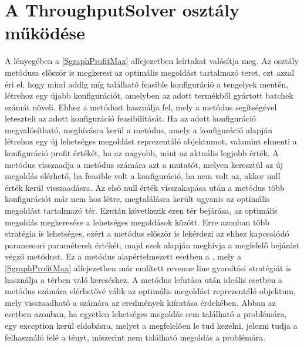 \section{A ThroughputSolver osztály működése} \label{throughput_solver}
A  lényegében a \ref{SgraphProfitMax} alfejezetben leírtakat valósítja meg.
Az osztály  metódusa először is megkeresi az optimális megoldást tartalmazó teret, ezt azzal éri el, hogy mind addig míg található feasible konfiguráció a tengelyek mentén, létrehoz egy újabb konfigurációt, amelyben az adott termékből gyártott batchek számát növeli.
Ehhez a  metódust használja fel, mely a  metódus segítségével leteszteli az adott konfiguráció feasibilitását.
Ha az adott konfiguráció megvalósítható, meghívásra kerül a  metódus, amely a konfiguráció alapján létrehoz egy új lehetséges megoldást reprezentáló objektumot, valamint elmenti a konfiguráció profit értékét, ha az nagyobb, mint az aktuális legjobb érték.
A  metódus visszaadja a  metódus számára azt a mutatót, melyen keresztül az új megoldás elérhető, ha feasible volt a konfiguráció, ha nem volt az, akkor null érték kerül visszaadásra.
Az első null érték visszakapása után a  metódus több konfigurációt már nem hoz létre, megtalálásra került ugyanis az optimális megoldást tartalmazó tér.
Ezután következik ezen tér bejárása, az optimális megoldás megkeresése a lehetséges megoldások között.
Erre azonban több stratégia is lehetséges, ezért a  metódus először is lekérdezi az ehhez kapcsolódó parancssori paraméterek értékét, majd ezek alapján meghívja a megfelelő bejárást végző metódust.
Ez a metódus alapértelmezett esetben a , mely a \ref{SgraphProfitMax} alfejezetben már említett revenue line gyorsítási stratégiát is használja a térben való kereséshez.
A metódus lefutása után ideális esetben a  metódus számára elérhetővé válik az optimális megoldást reprezentáló objektum, mely visszaadható a  számára az eredmények kiíratása érdekében.
Abban az esetben azonban, ha egyetlen lehetséges megoldás sem található a problémára, egy exception kerül eldobásra, melyet a  megfelelően le tud kezelni, jelezni tudja a felhasználó felé a tényt, miszerint nem található megoldás a problémára.